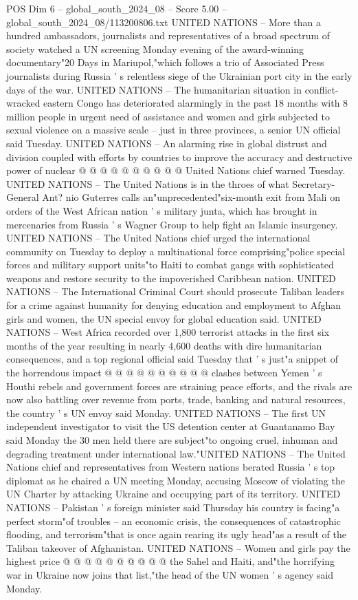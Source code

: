 \begin{textsample}{POS Dim 6 – global\_south\_2024\_08 – Score 5.00 – global\_south\_2024\_08/113200806.txt}
UNITED NATIONS -- More than a hundred ambassadors, journalists and representatives of a broad spectrum of society watched a UN screening Monday evening of the award-winning documentary"20 Days in Mariupol,"which follows a trio of Associated Press journalists during Russia ' s relentless siege of the Ukrainian port city in the early days of the war.
UNITED NATIONS -- The humanitarian situation in conflict-wracked eastern Congo has deteriorated alarmingly in the past 18 months with 8 million people in urgent need of assistance and women and girls subjected to sexual violence on a massive scale -- just in three provinces, a senior UN official said Tuesday.
UNITED NATIONS -- An alarming rise in global distrust and division coupled with efforts by countries to improve the accuracy and destructive power of nuclear @ @ @ @ @ @ @ @ @ @ United Nations chief warned Tuesday.
UNITED NATIONS -- The United Nations is in the throes of what Secretary-General Ant? nio Guterres calls an"unprecedented"six-month exit from Mali on orders of the West African nation ' s military junta, which has brought in mercenaries from Russia ' s Wagner Group to help fight an Islamic insurgency.
UNITED NATIONS -- The United Nations chief urged the international community on Tuesday to deploy a multinational force comprising"police special forces and military support units"to Haiti to combat gangs with sophisticated weapons and restore security to the impoverished Caribbean nation.
UNITED NATIONS -- The International Criminal Court should prosecute Taliban leaders for a crime against humanity for denying education and employment to Afghan girls and women, the UN special envoy for global education said.
UNITED NATIONS -- West Africa recorded over 1,800 terrorist attacks in the first six months of the year resulting in nearly 4,600 deaths with dire humanitarian consequences, and a top regional official said Tuesday that ' s just"a snippet of the horrendous impact @ @ @ @ @ @ @ @ @ @ clashes between Yemen ' s Houthi rebels and government forces are straining peace efforts, and the rivals are now also battling over revenue from ports, trade, banking and natural resources, the country ' s UN envoy said Monday.
UNITED NATIONS -- The first UN independent investigator to visit the US detention center at Guantanamo Bay said Monday the 30 men held there are subject"to ongoing cruel, inhuman and degrading treatment under international law."UNITED NATIONS -- The United Nations chief and representatives from Western nations berated Russia ' s top diplomat as he chaired a UN meeting Monday, accusing Moscow of violating the UN Charter by attacking Ukraine and occupying part of its territory.
UNITED NATIONS -- Pakistan ' s foreign minister said Thursday his country is facing"a perfect storm"of troubles -- an economic crisis, the consequences of catastrophic flooding, and terrorism"that is once again rearing its ugly head"as a result of the Taliban takeover of Afghanistan.
UNITED NATIONS -- Women and girls pay the highest price @ @ @ @ @ @ @ @ @ @ the Sahel and Haiti, and"the horrifying war in Ukraine now joins that list,"the head of the UN women ' s agency said Monday.

\end{textsample}
